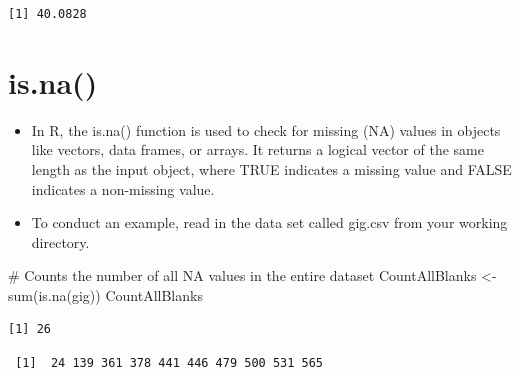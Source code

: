 \documentclass[
  letterpaper,
  DIV=11,
  numbers=noendperiod]{scrreprt}
\newenvironment{Shaded}{\begin{snugshade}}{\end{snugshade}}
\newcommand{\AttributeTok}[1]{\textcolor[rgb]{0.40,0.45,0.13}{#1}}
\newcommand{\CommentTok}[1]{\textcolor[rgb]{0.37,0.37,0.37}{#1}}
\newcommand{\ConstantTok}[1]{\textcolor[rgb]{0.56,0.35,0.01}{#1}}
\newcommand{\FunctionTok}[1]{\textcolor[rgb]{0.28,0.35,0.67}{#1}}
\newcommand{\NormalTok}[1]{\textcolor[rgb]{0.00,0.23,0.31}{#1}}
\newcommand{\OtherTok}[1]{\textcolor[rgb]{0.00,0.23,0.31}{#1}}
\newcommand{\SpecialCharTok}[1]{\textcolor[rgb]{0.37,0.37,0.37}{#1}}
\providecommand{\tightlist}{%
  \setlength{\itemsep}{0pt}\setlength{\parskip}{0pt}}\usepackage{longtable,booktabs,array}
\begin{document}
\begin{Shaded}
\end{Shaded}

\begin{verbatim}
[1] 40.0828
\end{verbatim}

\section{is.na()}\label{is.na}

\begin{itemize}
\tightlist
\item
  In R, the is.na() function is used to check for missing (NA) values in
  objects like vectors, data frames, or arrays. It returns a logical
  vector of the same length as the input object, where TRUE indicates a
  missing value and FALSE indicates a non-missing value.
\item
  To conduct an example, read in the data set called gig.csv from your
  working directory.
\end{itemize}

\begin{Shaded}
\begin{Highlighting}[]
\CommentTok{\# Counts the number of all NA values in the entire dataset}
\NormalTok{CountAllBlanks }\OtherTok{\textless{}{-}} \FunctionTok{sum}\NormalTok{(}\FunctionTok{is.na}\NormalTok{(gig))}
\NormalTok{CountAllBlanks}
\end{Highlighting}
\end{Shaded}

\begin{verbatim}
[1] 26
\end{verbatim}

\begin{Shaded}
\end{Shaded}

\begin{verbatim}
 [1]  24 139 361 378 441 446 479 500 531 565
\end{verbatim}
\end{document}

